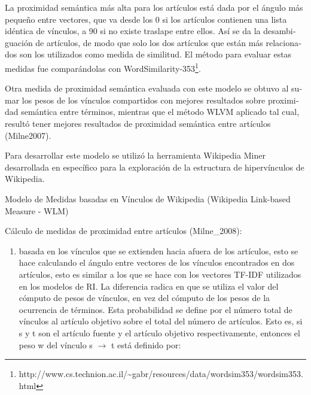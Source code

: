 \documentclass[letterpaper]{article}
\newcommand\textstylebibuscitbase[1]{#1}
\newcommand\liststyleLxv{%
\renewcommand\theenumi{\arabic{enumi}}
\renewcommand\theenumii{\arabic{enumii}}
\renewcommand\theenumiii{\arabic{enumiii}}
\renewcommand\theenumiv{\arabic{enumiv}}
\renewcommand\labelenumi{\theenumi.}
\renewcommand\labelenumii{\theenumii.}
\renewcommand\labelenumiii{\theenumiii.}
\renewcommand\labelenumiv{\theenumiv.}
}
\begin{document}
\bigskip

{\sffamily
\foreignlanguage{spanish}{La proximidad sem\'antica m\'as alta para los
art\'iculos est\'a dada por el \'angulo m\'as peque\~no entre vectores,
que va desde los 0{\textdegree} si los art\'iculos contienen una
}\foreignlanguage{spanish}{lista id\'entica de v\'inculos, a
90{\textdegree} si no existe traslape entre ellos. As\'i se da la
desambiguaci\'on de art\'iculos, de modo que solo los dos art\'iculos
que est\'an m\'as relacionados son los utilizados como medida de
similitud. El m\'etodo para evaluar estas medidas
}\foreignlanguage{spanish}{fue compar\'andolas
con}\foreignlanguage{spanish}{
WordSimilarity-353}\footnote{http://www.cs.technion.ac.il/\~{}gabr/resources/data/wordsim353/wordsim353.html}\foreignlanguage{spanish}{.}}


\bigskip

{\sffamily
\foreignlanguage{spanish}{Otra medida de proximidad sem\'antica evaluada
con este modelo }\foreignlanguage{spanish}{se obtuvo
al}\foreignlanguage{spanish}{ sumar }\foreignlanguage{spanish}{los
pesos de los}\foreignlanguage{spanish}{ v\'inculos compartidos con
mejores resultados sobre proximidad sem\'antica entre t\'erminos,
mientras que el m\'etodo WLVM aplicado tal cual, result\'o tener
mejores resultados de proximidad sem\'antica entre
}\foreignlanguage{spanish}{art\'iculos
}\textstylebibuscitbase{\foreignlanguage{spanish}{(Milne2007)}}\foreignlanguage{spanish}{.}}


\bigskip

{\sffamily
Para desarrollar este modelo se utiliz\'o la herramienta Wikipedia Miner
desarrollada en espec\'ifico para la exploraci\'on de la estructura de
hiperv\'inculos de Wikipedia. }

{\sffamily
Modelo de Medidas basadas en V\'inculos de Wikipedia (Wikipedia
Link-based Measure - WLM)}


\bigskip

{\sffamily
\foreignlanguage{spanish}{C\'alculo de medidas de proximidad entre
art\'iculos
}\textstylebibuscitbase{\foreignlanguage{spanish}{(Milne\_2008)}}\foreignlanguage{spanish}{:}}


\bigskip

\liststyleLxv
\begin{enumerate}
\item {\sffamily
basada en los v\'inculos que se extienden hacia afuera de los
art\'iculos, esto se hace calculando el \'angulo entre vectores de los
v\'inculos encontrados en dos art\'iculos, esto es similar a los que se
hace con los vectores TF-IDF utilizados en los modelos de RI. La
diferencia radica en que se utiliza el valor del c\'omputo de pesos de
v\'inculos, en vez del c\'omputo de los pesos de la ocurrencia de
t\'erminos. Esta probabilidad se define por el n\'umero total de
v\'inculos al art\'iculo objetivo sobre el total del n\'umero de
art\'iculos. Esto es, si s y t son el art\'iculo fuente y el art\'iculo
objetivo respectivamente, entonces el peso w del v\'inculo s
$\rightarrow $ t est\'a definido por:}
\end{enumerate}
\end{document}
